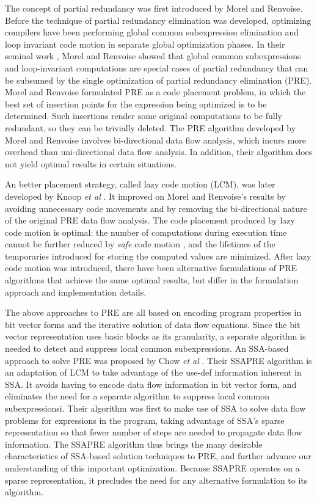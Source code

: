 The concept of partial redundancy was first introduced by Morel and 
Renvoise.  Before the technique of partial redundancy 
elimination was developed, optimizing compilers have been performing
global common subexpression elimination and loop invariant code motion in
separate global optimization phases.  In their seminal work \cite{MR79}, 
Morel and Renvoise showed that
global common subexpressions and loop-invariant computations are special
cases of partial redundancy that can be subsumed by the single
optimization of partial redundancy
elimination (PRE).  Morel and Renvoise formulated PRE as a code placement
problem, in which the best set of insertion points for the
expression being optimized is to be determined.  
Such insertions render some original
computations to be fully redundant, so they can be trivially
deleted.  The PRE algorithm developed by Morel and Renvoise
involves bi-directional data flow analysis, which incurs more overhead
than uni-directional data flow analysis.  In addition, their algorithm
does not yield optimal results in certain situations.

An better placement strategy, called lazy code motion (LCM), was later 
developed by Knoop {\it et al} \cite{Knoop92}\cite{Knoop94}.  It improved on
Morel and Renvoise's results by avoiding unnecessary code movements and by
removing the bi-directional nature of the original PRE data flow analysis.
The code placement produced by lazy code motion is optimal: the number of 
computations during execution time cannot
be further reduced by \emph{safe} code motion \cite{Kennedy72}, and the
lifetimes of the temporaries introduced for storing the computed values are 
minimized. After lazy code motion was introduced, there have been alternative 
formulations of PRE algorithms that achieve the same optimal results, 
but differ in the formulation approach and implementation 
details\cite{DS93}\cite{Dhamdhere02}\cite{Paleri03}\cite{XueKnoop06}.

The above approaches to PRE are all based on encoding program properties 
in bit vector forms and the iterative solution of data flow equations.
Since the bit vector representation uses basic blocks as its granularity,
a separate algorithm is needed to detect and suppress local common
subexpressions.
An SSA-based approach to solve PRE was proposed by Chow {\it et al} 
\cite{Chow97}\cite{Kennedy99}.  Their SSAPRE algorithm is an adaptation of LCM
to take advantage of the use-def information inherent in SSA.  It avoids
having to encode data flow information in bit vector form, and eliminates the
need for a separate algorithm to suppress local common subexpressionsi.
Their algorithm was first to make use of SSA to solve data flow problems
for expressions in the program, taking advantage of SSA's sparse representation
so that fewer number of steps are needed to propagate data flow information.  
The SSAPRE algorithm thus brings the many
desirable characteristics of SSA-based solution techniques to PRE, and 
further advance our understanding of this important optimization. 
Because SSAPRE operates on a sparse representation, it precludes the need
for any alternative formulation to its algorithm.

